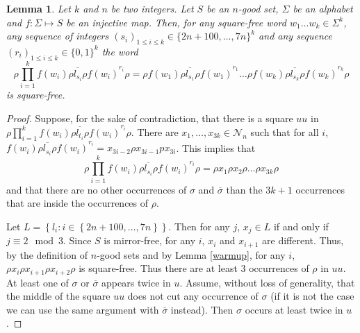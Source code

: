 \documentclass[a4paper,12pt]{article}
\newtheorem{lemma}{Lemma}
\newcommand{\pal}{\rho}
\newcommand{\hpal}{\sigma}
\begin{document}
\begin{lemma}\label{mainlemmainject}
Let $k$ and $n$ be two integers. Let $S$ be an $n$-good set, $\Sigma$ be an alphabet and $f:\Sigma\mapsto S$ be an injective map. Then, for any square-free word $w_1\ldots w_k\in \Sigma^k$, any sequence of integers $(s_i)_{1\le i\le k}\in \{2n+100,\ldots, 7n\}^k$ and any sequence $(r_i)_{1\le i\le k}\in \{0,1\}^k$ the word 
$$\pal\prod_{i=1}^k \overline {f(w_i)\pal l_{s_i}\pal f(w_i)}^{r_i}\pal=
\pal\overline {f(w_1)\pal l_{s_1}\pal f(w_1)}^{r_1}
\ldots 
\pal\overline {f(w_k)\pal l_{s_k}\pal f(w_k)}^{r_k}\pal$$
is square-free.
\end{lemma}
\begin{proof}
Suppose, for the sake of contradiction, that there is a square $uu$ in $\pal\prod_{i=1}^k \overline {f(w_i)\pal l_{t_i}\pal f(w_i)}^{r_i}\pal$.
There are $x_1,\ldots,x_{3k}\in\mathcal{N}_n$ such that
for all $i$, $\overline {f(w_i)\pal l_{s_i}\pal f(w_i)}^{r_i}=x_{3i-2}\pal x_{3i-1}px_{3i}$. This implies that 
$$\pal\prod_{i=1}^k \overline {f(w_i)\pal l_{s_i}\pal f(w_i)}^{r_i}\pal=\pal x_1\pal x_2\pal \ldots \pal  x_{3k}\pal $$
and that there are no other occurrences of $\hpal $ and $\overline{\hpal} $ than the $3k+1$ occurrences that are inside the occurrences of $\pal $.

Let  $L= \left\{l_i:i\in \left\{2n+100,\ldots, 7n\right\}\right\}$. Then for any $j$,  $x_j\in L$ if and only if $j\equiv 2 \mod 3$.
Since $S$ is mirror-free, for any $i$, $x_i$ and $x_{i+1}$ are different. 
Thus, by the definition of $n$-good sets and by Lemma \ref{warmup}, for any $i$, $\pal x_i\pal x_{i+1}\pal x_{i+2}\pal$ is square-free. Thus there are at least $3$ occurrences of $\pal$ in $uu$. At least one of $\hpal$ or $\overline{\hpal}$ appears twice in $u$.
Assume, without loss of generality, that the middle of the square $uu$ does not cut any occurrence of $\hpal $ (if it is not the case we can use the same argument with $\overline{\hpal} $ instead). Then $\hpal$ occurs at least twice in $u$.


\end{proof}
\end{document}
